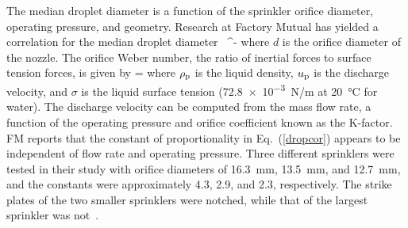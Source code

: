The median droplet diameter is a function of the sprinkler orifice diameter, operating pressure, and geometry. Research at Factory Mutual has yielded a correlation for the median droplet diameter~\cite{Yu:2}
\be
    \propto \WE^{-\ot}  \label{dropcor}
\ee
where $d$ is the orifice diameter of the nozzle. The orifice Weber number, the ratio of inertial forces to surface tension forces, is given by
\be
   \WE =   \label{Weber}
\ee
where $\rho_{\rm p}$ is the liquid density, $u_{\rm p}$ is the discharge velocity, and $\sigma$ is the liquid surface tension (\SI{72.8e-3}{N/m} at \SI{20}{\degreeCelsius} for water).
The discharge velocity can be computed from the mass flow rate, a function of the operating pressure and orifice coefficient known as the K-factor. FM reports that the constant of proportionality in Eq.~(\ref{dropcor}) appears to be independent of flow rate and operating pressure. Three different sprinklers were tested in their study with orifice diameters of \SI{16.3}{\milli m}, \SI{13.5}{\milli m}, and \SI{12.7}{\milli m}, and the constants were approximately 4.3, 2.9, and 2.3, respectively. The strike plates of the two smaller sprinklers were notched, while that of the largest sprinkler was not~\cite{Yu:2}.

